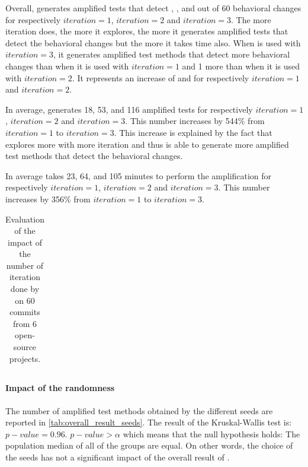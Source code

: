 Overall, \DCII generates amplified tests that detect , , and  out of 60 behavioral changes for respectively $iteration=1$, $iteration=2$ and $iteration=3$.
The more iteration \DCII does, the more it explores, the more it generates amplified tests that detect the behavioral changes but the more it takes time also.
When \DCII is used with $iteration=3$, it generates amplified test methods that detect  more behavioral changes than when it is used with $iteration=1$ and 1 more than when it is used with $iteration=2$. It represents an increase of  and  for respectively $iteration=1$ and $iteration=2$.

In average, \DCII generates 18, 53, and 116 amplified tests for respectively $iteration=1$, $iteration=2$ and $iteration=3$. 
This number increases by 544\% from $iteration=1$ to $iteration=3$.
This increase is explained by the fact that \DCII explores more with more iteration and thus is able to generate more amplified test methods that detect the behavioral changes.

In average \DCII takes 23, 64, and 105 minutes to perform the amplification for respectively $iteration=1$, $iteration=2$ and $iteration=3$.
This number increases by 356\% from $iteration=1$ to $iteration=3$.

\begin{table}
\small
\def\arraystretch{0.7}%
\setlength\tabcolsep{4pt} %
\caption{Evaluation of the impact of the number of iteration done by \DCII on 60 commits from 6 open-source projects.}
\label{tab:overall_result_iteration}
\begin{tabular}{l|c|cc|cc|cc}

\end{tabular}
\end{table}

\paragraph{Impact of the randomness}

The number of amplified test methods obtained by the different seeds are reported in \autoref{tab:overall_result_seeds}.
The result of the Kruskal-Wallis test is:  $p-value=0.96$.
$p-value>\alpha$ which means that the null hypothesis holds:
The population median of all of the groups are equal.
On other words, the choice of the seeds has not a significant impact of the overall result of \DCI.

